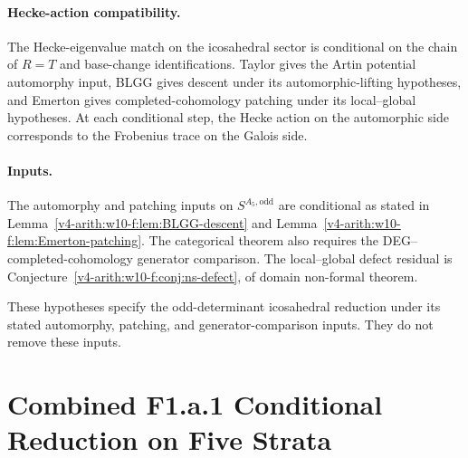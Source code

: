 \paragraph{Hecke-action compatibility.} The Hecke-eigenvalue match on
the icosahedral sector is conditional on the chain of \(R=T\) and
base-change identifications. Taylor gives the Artin potential
automorphy input, BLGG gives descent under its automorphic-lifting
hypotheses, and Emerton gives completed-cohomology patching under its
local--global hypotheses. At each conditional step, the Hecke action on
the automorphic side corresponds to the Frobenius trace on the Galois
side.

\paragraph{Inputs.} The automorphy and patching inputs on
\(S^{A_{5},\mathrm{odd}}\) are conditional as stated in
Lemma~\ref{v4-arith:w10-f:lem:BLGG-descent} and
Lemma~\ref{v4-arith:w10-f:lem:Emerton-patching}.
The categorical theorem also requires the DEG--completed-cohomology
generator comparison. The local--global
defect residual is Conjecture~\ref{v4-arith:w10-f:conj:ns-defect}, of domain
non-formal theorem.



These hypotheses specify the odd-determinant icosahedral reduction under
its stated automorphy, patching, and generator-comparison inputs. They
do not remove these inputs.

\section{Combined F1.a.1 Conditional Reduction on Five Strata}
\label{v4-arith:w10-f:combined}


